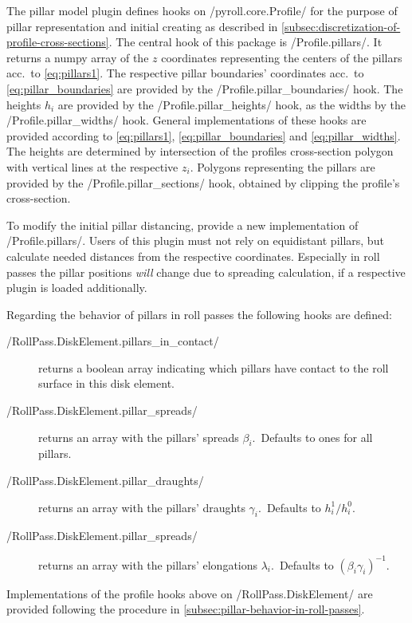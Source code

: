 \documentclass[11pt]{PyRollDocs}
\begin{document}
    The pillar model plugin defines hooks on \py/pyroll.core.Profile/ for the purpose of pillar representation and initial creating as described in \autoref{subsec:discretization-of-profile-cross-sections}.
    The central hook of this package is \py/Profile.pillars/.
    It returns a numpy array of the $z$ coordinates representing the centers of the pillars acc.\ to \autoref{eq:pillars1}.
    The respective pillar boundaries' coordinates acc.\ to \autoref{eq:pillar_boundaries}  are provided by the \py/Profile.pillar_boundaries/ hook.
    The heights $h_i$ are provided by the \py/Profile.pillar_heights/ hook, as the widths by the \py/Profile.pillar_widths/ hook.
    General implementations of these hooks are provided according to \autoref{eq:pillars1}, \autoref{eq:pillar_boundaries} and \autoref{eq:pillar_widths}.
    The heights are determined by intersection of the profiles cross-section polygon with vertical lines at the respective $z_i$.
    Polygons representing the pillars are provided by the \py/Profile.pillar_sections/ hook, obtained by clipping the profile's cross-section.

    To modify the initial pillar distancing, provide a new implementation of \py/Profile.pillars/.
    Users of this plugin must not rely on equidistant pillars, but calculate needed distances from the respective coordinates.
    Especially in roll passes the pillar positions \emph{will} change due to spreading calculation, if a respective plugin is loaded additionally.

    Regarding the behavior of pillars in roll passes the following hooks are defined:
    \begin{description}
        \item[\py/RollPass.DiskElement.pillars_in_contact/] returns a boolean array indicating which pillars have contact to the roll surface in this disk element.
        \item[\py/RollPass.DiskElement.pillar_spreads/] returns an array with the pillars' spreads $\beta_i$.~Defaults to ones for all pillars.
        \item[\py/RollPass.DiskElement.pillar_draughts/] returns an array with the pillars' draughts $\gamma_i$.~Defaults to $h_i^1 / h_i^0$.
        \item[\py/RollPass.DiskElement.pillar_spreads/] returns an array with the pillars' elongations $\lambda_i$.~Defaults to $(\beta_i\gamma_i)^{-1}$.
    \end{description}

    Implementations of the profile hooks above on \py/RollPass.DiskElement/ are provided following the procedure in \autoref{subsec:pillar-behavior-in-roll-passes}.
\end{document}
